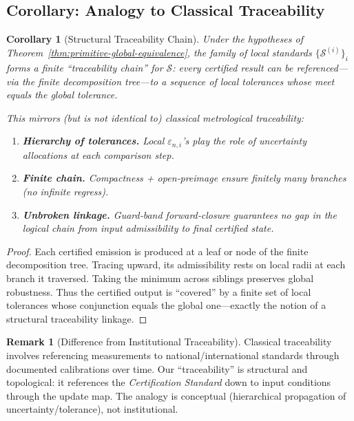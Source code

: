 \documentclass[12pt]{article}
\theoremstyle{definition}
\newtheorem{remark}{Remark}[section]
\theoremstyle{plain}
\newtheorem{corollary}{Corollary}[section]
\begin{document}
\subsection{Corollary: Analogy to Classical Traceability}
\label{subsec:traceability-analogy}

\begin{corollary}[Structural Traceability Chain]
\label{cor:traceability-analogy}
Under the hypotheses of Theorem~\ref{thm:primitive-global-equivalence}, the family of local standards $\{\mathcal S^{(i)}\}_i$ forms a finite “traceability chain” for $\mathcal S$: every certified result can be referenced—via the finite decomposition tree—to a sequence of local tolerances whose meet equals the global tolerance. 

This mirrors (but is not identical to) classical metrological traceability:
\begin{enumerate}
  \item \textbf{Hierarchy of tolerances.} Local $\varepsilon_{n,i}$’s play the role of uncertainty allocations at each comparison step.
  \item \textbf{Finite chain.} Compactness + open‑preimage ensure finitely many branches (no infinite regress).
  \item \textbf{Unbroken linkage.} Guard‑band forward‑closure guarantees no gap in the logical chain from input admissibility to final certified state.
\end{enumerate}
\end{corollary}

\begin{proof}
Each certified emission is produced at a leaf or node of the finite decomposition tree.  Tracing upward, its admissibility rests on local radii at each branch it traversed. Taking the minimum across siblings preserves global robustness. Thus the certified output is “covered” by a finite set of local tolerances whose conjunction equals the global one—exactly the notion of a structural traceability linkage. 
\end{proof}

\begin{remark}[Difference from Institutional Traceability]
Classical traceability involves referencing measurements to national/international standards through documented calibrations over time. Our “traceability” is structural and topological: it references the \emph{Certification Standard} down to input conditions through the update map. The analogy is conceptual (hierarchical propagation of uncertainty/tolerance), not institutional.
\end{remark}
\end{document}
